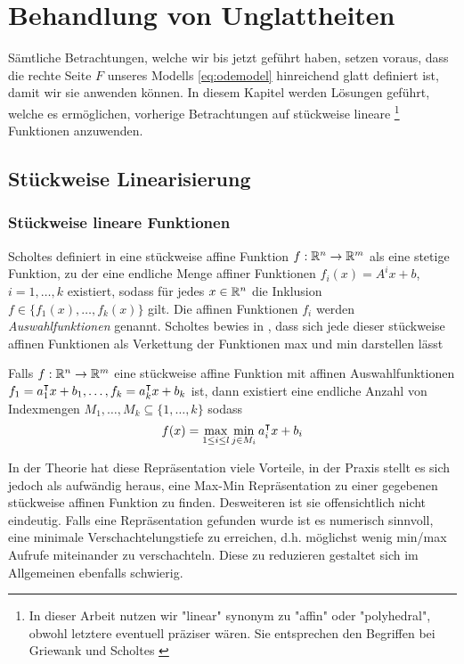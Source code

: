 \chapter{Behandlung von Unglattheiten}
Sämtliche Betrachtungen, welche wir bis jetzt geführt haben, setzen voraus, dass die rechte Seite $F$ unseres Modells \eqref{eq:odemodel} hinreichend glatt definiert ist, damit wir sie anwenden können. In diesem Kapitel werden Lösungen geführt, welche es ermöglichen, vorherige Betrachtungen auf stückweise lineare
\footnote{In dieser Arbeit nutzen wir "linear" synonym zu "affin" oder "polyhedral", obwohl letztere eventuell präziser wären. Sie entsprechen den Begriffen bei Griewank \cite{monster} und Scholtes \cite{scholtes2012introduction}}
Funktionen
anzuwenden. 

\section{Stückweise Linearisierung}

\subsection{Stückweise lineare Funktionen}
Scholtes definiert in \cite[S.19]{scholtes2012introduction} eine stückweise affine Funktion $f:\mathbb{R}^n\to \mathbb{R}^m$ als eine stetige Funktion, zu der eine endliche Menge affiner Funktionen $f_i(x)=A^ix+b$, $i=1,\ldots,k$ existiert, sodass für jedes $x\in \mathbb{R}^n$ die Inklusion $f\in\lbrace f_1(x),\ldots, f_k(x)\rbrace $ gilt. Die affinen Funktionen $f_i$ werden \textit{Auswahlfunktionen} genannt. Scholtes bewies in \cite[Prop.2.2.2.]{scholtes2012introduction}, dass sich jede dieser stückweise affinen Funktionen als Verkettung der Funktionen max und min darstellen lässt
\begin{theorem}
 Falls $f:\mathbb{R}^n\to \mathbb{R}^m$ eine stückweise affine Funktion mit affinen Auswahlfunktionen $f_1=a_1^\intercal x+ b_1,\ldots,f_k=a_k^\intercal x+ b_k$ ist, dann existiert eine endliche Anzahl von Indexmengen $M_1,\ldots,M_k\subseteq \lbrace 1,\ldots,k\rbrace$ sodass
 \[
  f(x) = \max_{1\leq i\leq l} \min_{j\in M_i} a_i^\intercal x + b_i
 \]
\end{theorem}
In der Theorie hat diese Repräsentation viele Vorteile, in der Praxis stellt es sich jedoch als aufwändig heraus, eine Max-Min Repräsentation zu einer gegebenen stückweise affinen Funktion zu finden. Desweiteren ist sie offensichtlich nicht eindeutig. Falls eine Repräsentation gefunden wurde ist es numerisch sinnvoll, eine minimale Verschachtelungstiefe zu erreichen, d.h. möglichst wenig min/max Aufrufe miteinander zu verschachteln. Diese zu reduzieren gestaltet sich im Allgemeinen ebenfalls schwierig.

